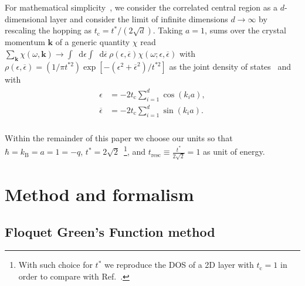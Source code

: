 \documentclass[aps,prb,groupedaddress,showpacs,twocolumn,superscriptaddress,10pt]{revtex4-2}
\newcommand*\dd{\mathop{}\!\mathrm{d}}
\renewcommand{\vec}[1]{\bm{#1}} %
\begin{document}
For mathematical simplicity~\cite{ge.ko.92,ao.ts.14}, we consider the correlated central region as a $d$-dimensional layer and consider the limit of infinite dimensions $d \rightarrow \infty$ by rescaling the hopping as $t_{\text{c}}=t^{\ast}/(2\sqrt{d})$. Taking $a=1$, sums over the crystal momentum $\vec{k}$ of a generic quantity $\chi$ read $\sum_{\vec{k}} \chi(\omega,\vec{k}) \rightarrow \int \dd\epsilon \int   \dd\overline{\epsilon} \ \rho(\epsilon,\overline{\epsilon}) \chi(\omega;\epsilon,\overline{\epsilon})$ with $\rho(\epsilon,\overline{\epsilon}) = (1/\pi t^{\ast 2}) \exp[-( \epsilon^{2} + \overline{\epsilon}^{2})/t^{\ast 2}]$ as the joint density of states~\cite{ts.ok.08} and with
% 
\begin{align}\label{eq:d-dim_crystal_dep}
\begin{split}
\epsilon & = -2t_{\text{c}} \sum_{i=1}^{d} \cos(k_i a), \\  
\overline{\epsilon}& = -2t_{\text{c}}\sum_{i=1}^{d} \sin(k_i a). \\
\end{split}  
\end{align}
  
Within the remainder of this paper we choose our units so that  $\hbar = k_{\text{B}} = a = 1 = -q$, $t^{\ast}=2\sqrt{2}$~\footnote{With such choice for $t^{\ast}$ we reproduce the DOS of a 2D layer with $t_{\text{c}}=1$  in order to compare with Ref.~\cite{so.do.18}.}, and $t_{\text{resc}} \equiv \frac{t^{\ast}}{2\sqrt{2}}=1$ as unit of energy.  
  

\section{Method and formalism}    
\label{sec:Method_formalism}  

\subsection{Floquet Green's Function method}   
\label{sec:GFs_Dyson_Floquet}
\end{document}

